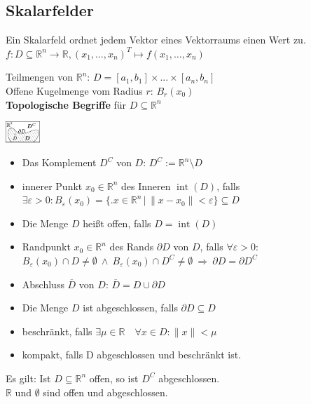 \documentclass[6pt,a4paper]{scrartcl}
\newcommand{\iset}[2]{\ensuremath{\bigl\{ \bigl. #1 \, \bigr| \, #2 \bigr\}}}					%
\newcommand{\norm}[1]{\ensuremath{\|#1\|}}														%
\newcommand{\inn}{\operatorname{int}}
\renewcommand{\emph}[1]{\textbf{#1}}															%
\newcommand{\ol}[1]{\ensuremath{\overline{#1}}}									%
\newcommand{\R}{\ensuremath{\mathbb R}}
\begin{document}
\begin{multicols*}{4}
\section{Skalarfelder}
Ein Skalarfeld ordnet jedem Vektor eines Vektorraums einen Wert zu.\\
$ f:D\subseteq \mathbb R^n \rightarrow \mathbb R, (x_1,\ldots ,x_n)^T \mapsto f(x_1,\ldots ,x_n) $
\parbox{5.5cm}{
Teilmengen von $\mathbb R^n$: $D = [a_1,b_1] \times ... \times [a_n,b_n]$\\
Offene Kugelmenge vom Radius $r$: $B_r(x_0)$\\
\emph{Topologische Begriffe} für $D \subseteq \mathbb R^n$ } \parbox{1.0cm}{ \includegraphics[height=0.8cm]{img/topologie.pdf} }
\begin{itemize}\itemsep-1pt
	\item Das Komplement $D^C$ von $D$: $D^C := \R^n \setminus D$
	\item innerer Punkt $x_0 \in \mathbb R^n$ des Inneren $\inn(D)$, falls \\
		$\exists \varepsilon > 0: B_\varepsilon (x_0) = \iset{x\in \mathbb R^n}{\norm{x-x_0} < \varepsilon} \subseteq D$
	\item Die Menge $D$ heißt offen, falls $D=\inn(D)$
	\item Randpunkt $x_0 \in \mathbb R^n$ des Rands $\partial D$ von $D$, falls $\forall \varepsilon > 0:$ \\ 
		$B_\varepsilon(x_0) \cap D \ne \emptyset \ \land \ B_\varepsilon(x_0) \cap D^C \ne \emptyset \ \Rightarrow \ \partial D = \partial D^C$
	\item Abschluss $\ol D$ von $D$: $\overline{D}=D \cup \partial D$
	\item Die Menge $D$ ist abgeschlossen, falls $\partial D \subseteq D$
	\item beschränkt, falls $\exists \mu \in \mathbb R \quad \forall x \in D: \norm{x} < \mu$
	\item kompakt, falls D abgeschlossen und beschränkt ist. 
\end{itemize}
Es gilt: Ist $D \subseteq \mathbb R^n$ offen, so ist $D^C$ abgeschlossen. \\
$\mathbb R$ und $\emptyset$ sind offen und abgeschlossen.


\end{multicols*}
\end{document}
